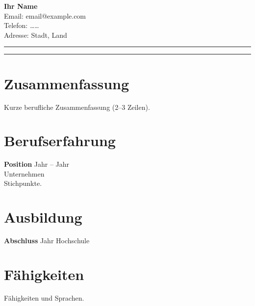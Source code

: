 \documentclass[11pt,a4paper]{article}
\begin{document}
\begin{minipage}[t]{0.72\textwidth}
\vspace{0pt}
{\LARGE \textbf{Ihr Name}}\\[0.25em]
Email: email@example.com \\
Telefon: …… \\
Adresse: Stadt, Land
\end{minipage}
\begin{minipage}[t]{0.25\textwidth}
\vspace{0pt}
\raggedleft
\rule{2.8cm}{3.2cm}
\end{minipage}
\vspace{0.5em}
\noindent\rule{\textwidth}{0.4pt}
\section*{Zusammenfassung}
Kurze berufliche Zusammenfassung (2--3 Zeilen).
\section*{Berufserfahrung}
\textbf{Position} \hfill Jahr -- Jahr \\
Unternehmen \\
Stichpunkte.
\section*{Ausbildung}
\textbf{Abschluss} \hfill Jahr \quad Hochschule
\section*{Fähigkeiten}
Fähigkeiten und Sprachen.
\end{document}
